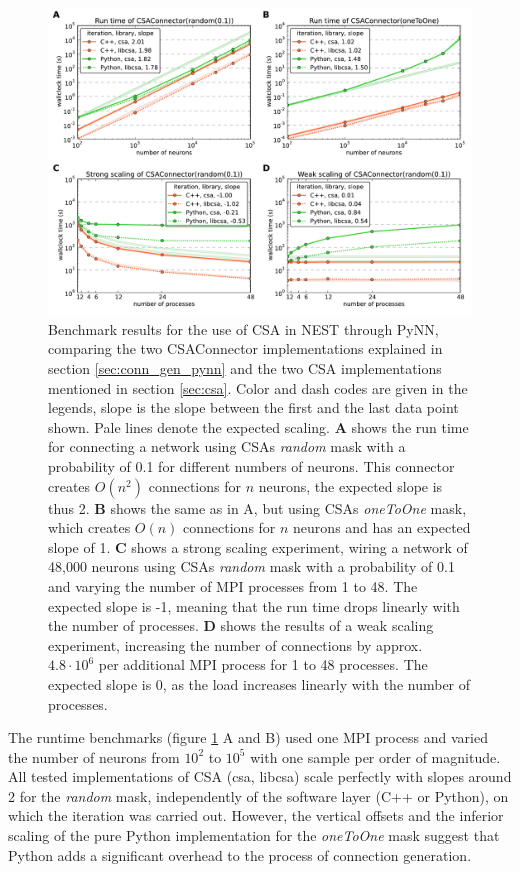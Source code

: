 \documentclass{frontiersSCNS} %
\begin{document}
\begin{figure}[ht]
\centering
\includegraphics[scale=.7]{benchmarks/CSAConnector/CSAConnector.pdf}
\caption{Benchmark results for the use of CSA in NEST through PyNN,
  comparing the two CSAConnector implementations explained in section
  \ref{sec:conn_gen_pynn} and the two CSA implementations mentioned in
  section \ref{sec:csa}. Color and dash codes are given in the
  legends, slope is the slope between the first and the last data
  point shown. Pale lines denote the expected scaling. \textbf{A}
  shows the run time for connecting a network using CSAs \emph{random}
  mask with a probability of 0.1 for different numbers of
  neurons. This connector creates $O(n^2)$ connections for $n$
  neurons, the expected slope is thus 2. \textbf{B} shows the same as
  in A, but using CSAs \emph{oneToOne} mask, which creates $O(n)$
  connections for $n$ neurons and has an expected slope of
  1. \textbf{C} shows a strong scaling experiment, wiring a network of
  48,000 neurons using CSAs \emph{random} mask with a probability of
  0.1 and varying the number of MPI processes from 1 to 48. The
  expected slope is -1, meaning that the run time drops linearly with
  the number of processes. \textbf{D} shows the results of a weak
  scaling experiment, increasing the number of connections by
  approx. $4.8 \cdot 10^6$ per additional MPI process for 1 to 48
  processes. The expected slope is 0, as the load increases linearly
  with the number of processes.}\label{fig:pynn_benchmarks}
\end{figure}

The runtime benchmarks (figure \ref{fig:pynn_benchmarks} A and B) used
one MPI process and varied the number of neurons from $10^2$ to $10^5$
with one sample per order of magnitude. All tested implementations of
CSA (csa, libcsa) scale perfectly with slopes around 2 for the
\emph{random} mask, independently of the software layer (C++ or Python), on
which the iteration was carried out. However, the vertical offsets and
the inferior scaling of the pure Python implementation for the
\emph{oneToOne} mask suggest that Python adds a significant overhead
to the process of connection generation.
\end{document}
